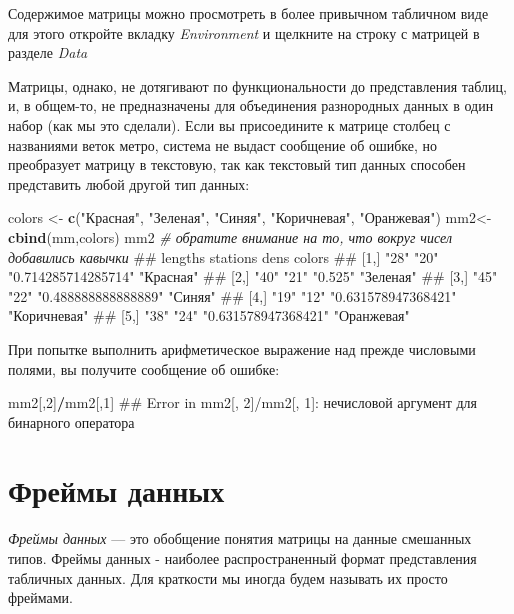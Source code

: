 \documentclass[]{book}
\newenvironment{Shaded}{\begin{snugshade}}{\end{snugshade}}
\newcommand{\KeywordTok}[1]{\textcolor[rgb]{0.13,0.29,0.53}{\textbf{#1}}}
\newcommand{\DecValTok}[1]{\textcolor[rgb]{0.00,0.00,0.81}{#1}}
\newcommand{\StringTok}[1]{\textcolor[rgb]{0.31,0.60,0.02}{#1}}
\newcommand{\CommentTok}[1]{\textcolor[rgb]{0.56,0.35,0.01}{\textit{#1}}}
\newcommand{\OperatorTok}[1]{\textcolor[rgb]{0.81,0.36,0.00}{\textbf{#1}}}
\newcommand{\NormalTok}[1]{#1}
\begin{document}
Содержимое матрицы можно просмотреть в более привычном табличном виде
для этого откройте вкладку \emph{Environment} и щелкните на строку с
матрицей в разделе \emph{Data}

Матрицы, однако, не дотягивают по функциональности до представления
таблиц, и, в общем-то, не предназначены для объединения разнородных
данных в один набор (как мы это сделали). Если вы присоедините к матрице
столбец с названиями веток метро, система не выдаст сообщение об ошибке,
но преобразует матрицу в текстовую, так как текстовый тип данных
способен представить любой другой тип данных:

\begin{Shaded}
\begin{Highlighting}[]
\NormalTok{colors <-}\StringTok{ }\KeywordTok{c}\NormalTok{(}\StringTok{"Красная"}\NormalTok{, }\StringTok{"Зеленая"}\NormalTok{, }\StringTok{"Синяя"}\NormalTok{, }\StringTok{"Коричневая"}\NormalTok{, }\StringTok{"Оранжевая"}\NormalTok{)}
\NormalTok{mm2<-}\KeywordTok{cbind}\NormalTok{(mm,colors)}
\NormalTok{mm2  }\CommentTok{# обратите внимание на то, что вокруг чисел добавились кавычки}
\NormalTok{##      lengths stations dens                colors      }
\NormalTok{## [1,] "28"    "20"     "0.714285714285714" "Красная"   }
\NormalTok{## [2,] "40"    "21"     "0.525"             "Зеленая"   }
\NormalTok{## [3,] "45"    "22"     "0.488888888888889" "Синяя"     }
\NormalTok{## [4,] "19"    "12"     "0.631578947368421" "Коричневая"}
\NormalTok{## [5,] "38"    "24"     "0.631578947368421" "Оранжевая"}
\end{Highlighting}
\end{Shaded}

При попытке выполнить арифметическое выражение над прежде числовыми
полями, вы получите сообщение об ошибке:

\begin{Shaded}
\begin{Highlighting}[]
\NormalTok{mm2[,}\DecValTok{2}\NormalTok{]}\OperatorTok{/}\NormalTok{mm2[,}\DecValTok{1}\NormalTok{]}
\NormalTok{## Error in mm2[, 2]/mm2[, 1]: нечисловой аргумент для бинарного оператора}
\end{Highlighting}
\end{Shaded}

\section{Фреймы данных}\label{data_frames}

\emph{Фреймы данных} --- это обобщение понятия матрицы на данные
смешанных типов. Фреймы данных - наиболее распространенный формат
представления табличных данных. Для краткости мы иногда будем называть
их просто фреймами.
\end{document}
